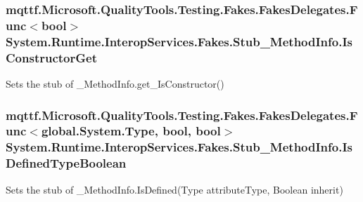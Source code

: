 \hypertarget{class_system_1_1_runtime_1_1_interop_services_1_1_fakes_1_1_stub___method_info_ac3f0cd47bc9e2b557ff2eb2b0d6ba901}{
\subsubsection[{Is\-Constructor\-Get}]{\setlength{\rightskip}{0pt plus 5cm}mqttf.\-Microsoft.\-Quality\-Tools.\-Testing.\-Fakes.\-Fakes\-Delegates.\-Func$<$bool$>$ System.\-Runtime.\-Interop\-Services.\-Fakes.\-Stub\-\_\-\-Method\-Info.\-Is\-Constructor\-Get}}\label{class_system_1_1_runtime_1_1_interop_services_1_1_fakes_1_1_stub___method_info_ac3f0cd47bc9e2b557ff2eb2b0d6ba901}


Sets the stub of \-\_\-\-Method\-Info.\-get\-\_\-\-Is\-Constructor()

\hypertarget{class_system_1_1_runtime_1_1_interop_services_1_1_fakes_1_1_stub___method_info_a5786b27e7581948812a1cbafea861a32}{
\subsubsection[{Is\-Defined\-Type\-Boolean}]{\setlength{\rightskip}{0pt plus 5cm}mqttf.\-Microsoft.\-Quality\-Tools.\-Testing.\-Fakes.\-Fakes\-Delegates.\-Func$<$global.\-System.\-Type, bool, bool$>$ System.\-Runtime.\-Interop\-Services.\-Fakes.\-Stub\-\_\-\-Method\-Info.\-Is\-Defined\-Type\-Boolean}}\label{class_system_1_1_runtime_1_1_interop_services_1_1_fakes_1_1_stub___method_info_a5786b27e7581948812a1cbafea861a32}


Sets the stub of \-\_\-\-Method\-Info.\-Is\-Defined(\-Type attribute\-Type, Boolean inherit)

